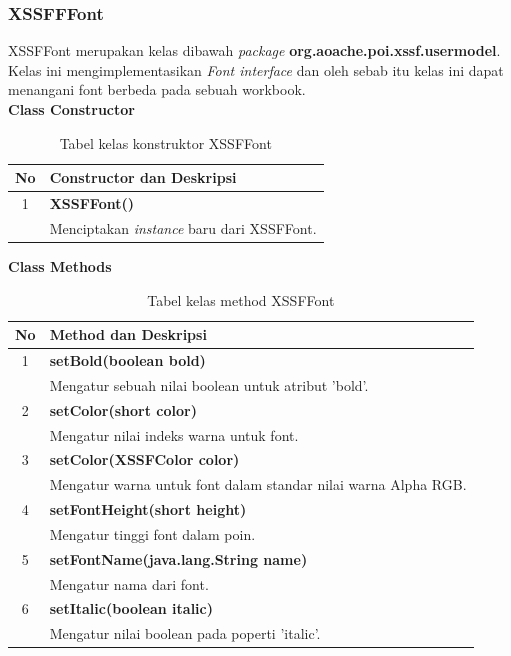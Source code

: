 \subsubsection{XSSFFFont}
\label{subs:XSSFFFont}
XSSFFont merupakan kelas dibawah \textit{package} \textbf{org.aoache.poi.xssf.usermodel}. Kelas ini mengimplementasikan \textit{Font interface} dan oleh sebab itu kelas ini dapat menangani font berbeda pada sebuah workbook.\cite{tutpoint}
\\
\noindent \textbf{Class Constructor}
\begin{table}[H]
		\centering
		\caption{Tabel kelas konstruktor XSSFFont}
		\label{tab:KonstrukXSSFFont}
	\begin{tabular}{|c|p{12cm}|}
		\hline
		\textbf{No} & \textbf{Constructor dan Deskripsi} \\ \hline \hline
		1 & \textbf{XSSFFont()}\\
			&	Menciptakan \textit{instance} baru dari XSSFFont.\\ \hline
	\end{tabular}
\end{table}

\noindent \textbf{Class Methods}
\begin{table}[H]
		\centering
		\caption{Tabel kelas method XSSFFont}
		\label{tab:methodXSSFFont}
	\begin{tabular}{|c|p{12cm}|}
		\hline
		\textbf{No} & \textbf{Method dan Deskripsi} \\ \hline \hline
		1 & \textbf{setBold(boolean bold)}\\
			&	Mengatur sebuah nilai boolean untuk atribut 'bold'.\\ \hline
		2 & \textbf{setColor(short color)}\\
			&	Mengatur nilai indeks warna untuk font.\\ \hline
		3 & \textbf{setColor(XSSFColor color)}\\
			&	Mengatur warna untuk font dalam standar nilai warna Alpha RGB.\\ \hline
		4 & \textbf{setFontHeight(short height)}\\
			&	Mengatur tinggi font dalam poin.\\ \hline
		5 & \textbf{setFontName(java.lang.String name)}\\
			&	Mengatur nama dari font.\\ \hline
		6 & \textbf{setItalic(boolean italic)}\\
			&	Mengatur nilai boolean pada poperti 'italic'.\\ \hline					
	\end{tabular}
\end{table}

